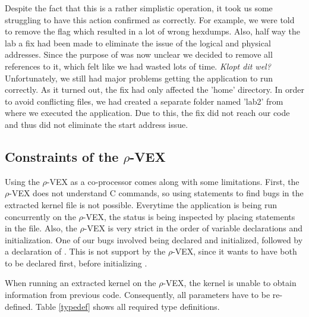 Despite the fact that this is a rather simplistic operation, it took us some struggling to have this action confirmed as correctly. For example, we were told to remove the  flag which resulted in a lot of wrong hexdumps. Also, half way the lab a fix had been made to eliminate the issue of the logical and physical addresses. Since the purpose of  was now unclear we decided to remove all references to it, which felt like we had wasted lots of time. \emph{Klopt dit wel?} 	Unfortunately, we still had major problems getting the application to run correctly. As it turned out, the fix had only affected the 'home' directory. In order to avoid conflicting files, we had created a separate folder named 'lab2' from where we executed the application. Due to this, the fix did not reach our code and thus did not eliminate the start address issue.

\subsection{Constraints of the $\rho$-VEX}

Using the $\rho$-VEX as a co-processor comes along with some limitations. First, the $\rho$-VEX does not understand C commands, so using  statements to find bugs in the extracted kernel file is not possible. Everytime the application is being run concurrently on the $\rho$-VEX, the status is being inspected by placing  statements in the  file. Also, the $\rho$-VEX is very strict in the order of variable declarations and initialization. One of our bugs involved  being declared and initialized, followed by a declaration of . This is not support by the $\rho$-VEX, since it wants to have  both to be declared first, before initializing .

When running an extracted kernel on the $\rho$-VEX, the kernel is unable to obtain information from previous code. Consequently, all parameters have to be re-defined. Table \ref{typedef} shows all required type definitions.

